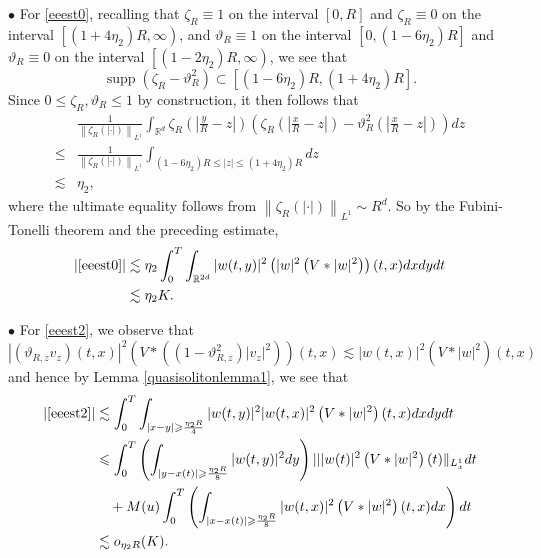 \documentclass[reqno,11pt]{amsart}
\theoremstyle{plain}
\theoremstyle{definition}
\numberwithin{equation}{section}
\numberwithin{theorem}{section}
\def\geq{\geqslant}
\def\leq{\leqslant}
\begin{document}
$\bullet$ For \eqref{eeest0},  recalling  that $\zeta_R \equiv 1$ on the interval $[0, R]$ and $\zeta_R \equiv 0$ on the interval $\left[\left(1+4 \eta_2\right) R, \infty\right)$, and  $\vartheta_R \equiv 1$ on the interval $\left[0,\left(1-6 \eta_2\right) R\right]$ and $\vartheta_R \equiv 0$ on the interval $\left[\left(1-2 \eta_2\right) R, \infty\right)$, we see that
\[
 \operatorname{supp}\left(\zeta_R-\vartheta_R^2\right) \subset\left[\left(1-6 \eta_2\right) R,\left(1+4 \eta_2\right) R\right].
\]
Since $0 \leq \zeta_R, \vartheta_R \leq 1$ by construction, it then follows that
\begin{align*}
& \frac{1}{\left\|\zeta_R(|\cdot|)\right\|_{L^1}} \int_{\mathbb{R}^d} \zeta_R\left(\left|\frac{y}{R} -z\right|\right)\left(\zeta_R\left(\left|\frac{x}{R} -z\right|\right)-\vartheta_R^2\left(\left|\frac{x}{R}-z\right|\right)\right) d z \\
 \leq& \frac{1}{\left\|\zeta_R(|\cdot|)\right\|_{L^1}} \int_{\left(1-6 \eta_2\right) R \leq|z| \leq\left(1+4 \eta_2\right) R} d z \\
 \lesssim& \eta_2,
\end{align*}
where the ultimate equality follows from $\left\|\zeta_R(|\cdot|)\right\|_{L^1} \sim R^d$. So by the Fubini-Tonelli theorem and the preceding estimate,
\begin{align}
|\eqref{eeest0}|& \lesssim \eta_2 \int_0^T \int_{\mathbb{R}^{2d}} |w(t, y)|^2\left(|w|^2\left(V *|w|^2\right)\right)(t, x) d x d y d t\notag \\
& \lesssim \eta_2 K.\label{aeeest0}
\end{align}

$\bullet$ For \eqref{eeest2}, we observe that
\begin{equation*}
\left|\left(\vartheta_{R,  z} v_{z}\right)(t, x)\right|^{2}\left(V *\left(\left(1-\vartheta_{R,  z}^{2}\right)\left|v_{z}\right|^{2}\right)\right)(t, x) \lesssim|w(t, x)|^{2}\left(V *|w|^{2}\right)(t, x)  
\end{equation*}
and hence by Lemma \ref{quasisolitonlemma1}, we see that
\begin{align}
    |\eqref{eeest2}|& \lesssim \int_{0}^{T} \int_{|x-y|\geq\frac{\eta_{2} R}{4 }} |w(t, y)|^{2}|w(t, x)|^{2}\left(V *|w|^{2}\right)(t, x) d x d y d t\notag\\
& \leq \int_{0}^{T} \left(\int_{|y-x(t)|\geq\frac{\eta_{2} R}{8}}|w(t, y)|^{2} d y\right)| ||w(t)|^{2}\left(V *|w|^{2}\right)(t) \|_{L_{x}^{1}} d t\notag \\
& \quad+M(u) \int_{0}^{T} \left(\int_{|x-x(t)|\geq\frac{\eta_{2} R}{8 }}|w(t, x)|^{2}\left(V *|w|^{2}\right)(t, x) d x\right) d t\notag\\
&\lesssim o_{\eta_2 R}(K). \label{aeeest2}
\end{align}
\end{document}
